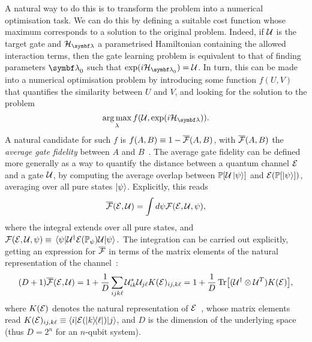 A natural way to do this is to transform the problem into a numerical optimisation task. We can do this by defining a suitable cost function whose maximum corresponds to a solution to the original problem.
Indeed, if ${\mathcal{U}}$ is the target gate and $\calH_\bslambda$ a parametrised Hamiltonian containing the allowed interaction terms, then the gate learning problem is equivalent to that of finding parameters $\bslambda_0$ such that $\exponential(i\calH_{\bslambda_0})=\calU$.
In turn, this can be made into a numerical optimisation problem by introducing some function $f(U, V)$ that quantifies the similarity between $U$ and $V$, and looking for the solution to the problem
\begin{equation}
    \argmax_\lambda f(\calU, \exponential(i\calH_{\bslambda})).
    \label{eq:GL:gatelearning_as_optimisation}
\end{equation}
A natural candidate for such $f$ is $f(A,B)\equiv 1-\overline{{\mathcal{F}}}(A,B)$, with $\overline{{\mathcal{F}}}(A,B)$ the \textit{average gate fidelity} between $A$ and $B$~\cite{nielsen2002simple,magesan2011gate}. The average gate fidelity can be defined more generally as a way to quantify the distance between a quantum channel ${\mathcal{E}}$ and a gate ${\mathcal{U}}$, by computing the average overlap between ${\mathbb{P}}[{\mathcal{U}}\ket\psi]$ and ${\mathcal{E}}({\mathbb{P}}[\ket\psi])$, averaging over all pure states $\ket\psi$. Explicitly, this reads
\begin{equation}
    \overline{{\mathcal{F}}}({\mathcal{E}},{\mathcal{U}}) = \int d\psi {\mathcal{F}}({\mathcal{E}}, {\mathcal{U}}, \psi),
\end{equation}
where the integral extends over all pure states, and
$
    {\mathcal{F}}({\mathcal{E}}, {\mathcal{U}}, \psi) \equiv
    \mel*{\psi}{{\mathcal{U}}^\dagger {\mathcal{E}}({\mathbb{P}}_\psi){\mathcal{U}}}{\psi}.
$
The integration can be carried out explicitly, getting an expression for $\overline{{\mathcal{F}}}$ in terms of the matrix elements of the natural representation of the channel~\cite{pedersen2007fidelity,banchi2011nonperturbative,magesan2011gate,banchi2016quantum}:
\begin{equation}
    (D+1) \overline{{\mathcal{F}}}({\mathcal{E}},{\mathcal{U}}) =
    1 + \frac{1}{D}\sum_{ijk\ell}{\mathcal{U}}^*_{ik} {\mathcal{U}}_{j\ell}K({\mathcal{E}})_{ij,k\ell}
    = 1 + \frac{1}{D}\Tr[({\mathcal{U}}^\dagger\otimes {\mathcal{U}}^T)K({\mathcal{E}})],
    \label{eq:GL:explicit_fidelity_map_unitary}
\end{equation}
where $K({\mathcal{E}})$ denotes the natural representation of ${\mathcal{E}}$~\cite{watrous2018theory}, whose matrix elements read
$K({\mathcal{E}})_{ij,k\ell}\equiv\langle i|{\mathcal{E}}(\ketbra{k}{\ell})|j\rangle$, and
$D$ is the dimension of the underlying space (thus $D=2^n$ for an $n$-qubit system).
